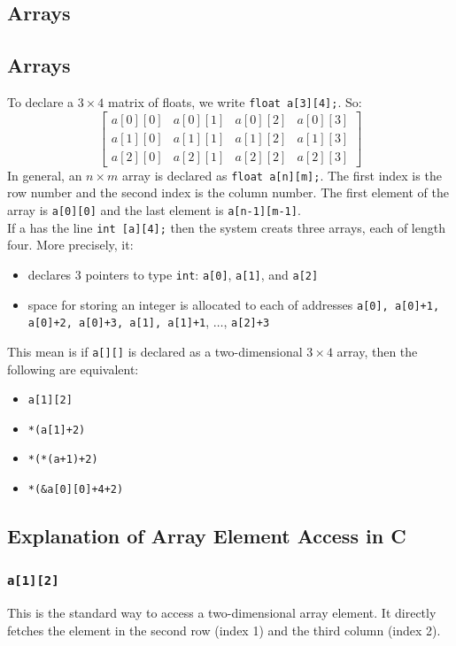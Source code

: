 \documentclass[a4paper, 10pt]{article}
\begin{document}
\subsection{Arrays}
\subsection{Arrays}
To declare a $3 \times 4$ matrix of floats, we write \texttt{float a[3][4];}. So:
$$\begin{bmatrix}
        a[0][0] & a[0][1] & a[0][2] & a[0][3] \\
        a[1][0] & a[1][1] & a[1][2] & a[1][3] \\
        a[2][0] & a[2][1] & a[2][2] & a[2][3]
    \end{bmatrix}
$$
In general, an $n \times m$ array is declared as \texttt{float a[n][m];}. The first index is the row number and the second index is the column number. The first element of the array is \texttt{a[0][0]} and the last element is \texttt{a[n-1][m-1]}. \\[2ex]
If a has the line \texttt{int [a][4];} then the system creats three arrays, each of length four. More precisely, it:
\begin{itemize}
    \item declares 3 pointers to type \texttt{int}: \texttt{a[0]}, \texttt{a[1]}, and \texttt{a[2]}
    \item space for storing an integer is allocated to each of addresses \texttt{a[0], a[0]+1, a[0]+2, a[0]+3, a[1], a[1]+1}, $\dots$, \texttt{a[2]+3}
\end{itemize}
This mean is if \texttt{a[][]} is declared as a two-dimensional $3 \times 4$ array, then the following are equivalent:
\begin{itemize}
    \item \texttt{a[1][2]}
    \item \texttt{*(a[1]+2)}
    \item \texttt{*(*(a+1)+2)}
    \item \texttt{*(\&a[0][0]+4+2)}
\end{itemize}
\subsection{Explanation of Array Element Access in C}

\subsubsection*{\texttt{a[1][2]}}
This is the standard way to access a two-dimensional array element. It directly fetches the element in the second row (index 1) and the third column (index 2).
\end{document}
